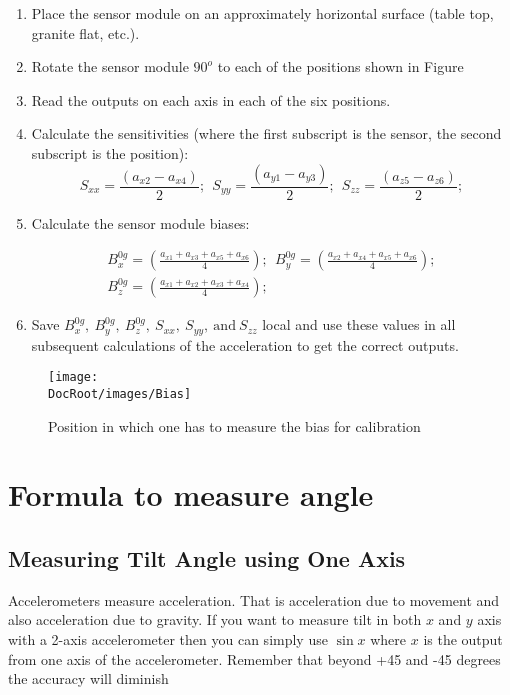 \begin{enumerate}
	\item Place the sensor module on an approximately horizontal surface (table top, granite flat, etc.).
	\item Rotate the sensor module $90^o$ to each of the positions shown in
	      Figure
	\item Read the outputs on each axis in each of the six positions.
	\item Calculate the sensitivities (where the first subscript is the sensor, the second subscript is the position):
	      \begin{equation}
		      S_{xx} = \frac{(a_{x2} - a_{x4})}{2};~~S_{yy} = \frac{(a_{y1} - a_{y3})}{2};~~S_{zz} = \frac{(a_{z5} - a_{z6})}{2};
	      \end{equation}
	      
	\item
	      Calculate the sensor module biases:
	      
	      \begin{multline}
		      B_x^{0g} = \left(\frac{a_{x1}+a_{x3}+a_{x5}+a_{x6}}{4}\right);~~ B_y^{0g} = \left(\frac{a_{x2}+a_{x4}+a_{x5}+a_{x6}}{4}\right);\\B_z^{0g} = \left(\frac{a_{x1}+a_{x2}+a_{x3}+a_{x4}}{4}\right);
	      \end{multline}
	      
	\item Save $B_x^{0g}, ~ B_y^{0g},~B_z^{0g},~S_{xx},~S_{yy},~\mathrm{and}~S_{zz}$ local and use these values in all subsequent calculations of the acceleration to get the correct outputs.
\end{enumerate}

\begin{figure}[h]
	\centering
	\texttt{[image: \\DocRoot/images/Bias]}
	\caption{Position in which one has to measure the bias for calibration}
	\label{Fig: Position to measure the bias}
\end{figure}

\tocless\section{Formula to measure angle}
\tocless\subsection{Measuring Tilt Angle using One Axis}
Accelerometers measure acceleration. That is acceleration due to movement and also acceleration due to gravity. If you want to measure tilt in both $x$ and $y$ axis with a 2-axis accelerometer then you can simply use $\sin x$ where $x$ is the output from one axis of the accelerometer. Remember that beyond +45 and -45 degrees the accuracy will diminish

